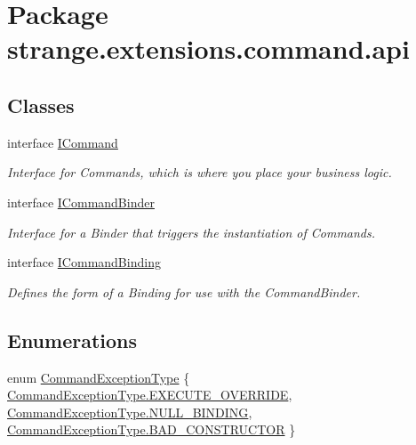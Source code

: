 \hypertarget{namespacestrange_1_1extensions_1_1command_1_1api}{\section{Package strange.\-extensions.\-command.\-api}
\label{namespacestrange_1_1extensions_1_1command_1_1api}
}
\subsection*{Classes}
\begin{DoxyCompactItemize}
\item 
interface \hyperlink{interfacestrange_1_1extensions_1_1command_1_1api_1_1_i_command}{I\-Command}
\begin{DoxyCompactList}\small\item\em Interface for Commands, which is where you place your business logic. \end{DoxyCompactList}\item 
interface \hyperlink{interfacestrange_1_1extensions_1_1command_1_1api_1_1_i_command_binder}{I\-Command\-Binder}
\begin{DoxyCompactList}\small\item\em Interface for a Binder that triggers the instantiation of Commands. \end{DoxyCompactList}\item 
interface \hyperlink{interfacestrange_1_1extensions_1_1command_1_1api_1_1_i_command_binding}{I\-Command\-Binding}
\begin{DoxyCompactList}\small\item\em Defines the form of a Binding for use with the Command\-Binder. \end{DoxyCompactList}\end{DoxyCompactItemize}
\subsection*{Enumerations}
\begin{DoxyCompactItemize}
\item 
enum \hyperlink{namespacestrange_1_1extensions_1_1command_1_1api_a27c9226cc8d55624f3294319d48879e3}{Command\-Exception\-Type} \{ \hyperlink{namespacestrange_1_1extensions_1_1command_1_1api_a27c9226cc8d55624f3294319d48879e3a649c27d7db043238f4e8ee0d1c8c52fc}{Command\-Exception\-Type.\-E\-X\-E\-C\-U\-T\-E\-\_\-\-O\-V\-E\-R\-R\-I\-D\-E}, 
\hyperlink{namespacestrange_1_1extensions_1_1command_1_1api_a27c9226cc8d55624f3294319d48879e3a35310c46c16e400ec14d3f312e93ec71}{Command\-Exception\-Type.\-N\-U\-L\-L\-\_\-\-B\-I\-N\-D\-I\-N\-G}, 
\hyperlink{namespacestrange_1_1extensions_1_1command_1_1api_a27c9226cc8d55624f3294319d48879e3a4ca656dfba09ff902c42fee01c7c8405}{Command\-Exception\-Type.\-B\-A\-D\-\_\-\-C\-O\-N\-S\-T\-R\-U\-C\-T\-O\-R}
 \}
\end{DoxyCompactItemize}


